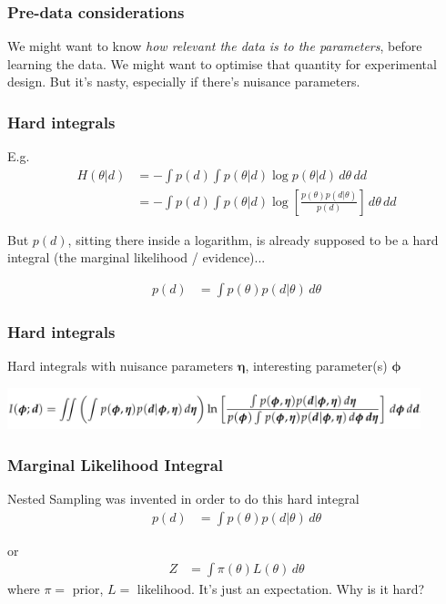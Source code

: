 \documentclass{beamer}
\begin{document}
\begin{frame}
\frametitle{Pre-data considerations}

We might want to know {\em how relevant the data is to the parameters},
before learning the data. We might want to optimise that quantity for
experimental design. But it's nasty, especially if there's nuisance
parameters.
\end{frame}


\begin{frame}
\frametitle{Hard integrals}

E.g.
\begin{align}
H(\theta|d) &= -\int p(d) \int p(\theta|d) \log p(\theta|d) \, d\theta \, dd \\
            &= -\int p(d) \int p(\theta|d)
                    \log\left[\frac{p(\theta)p(d|\theta)}{p(d)}\right] \, d\theta \, dd
\end{align}

But $p(d)$, sitting there inside a logarithm, is already supposed to be
a hard integral (the marginal likelihood / evidence)...

\begin{align}
p(d) &= \int p(\theta) p(d|\theta) \, d\theta
\end{align}

\end{frame}


\begin{frame}
\frametitle{Hard integrals}
Hard integrals with nuisance parameters
$\boldsymbol{\eta}$, interesting parameter(s)
$\boldsymbol{\phi}$
\vspace{0.5em}

\begin{center}
\includegraphics[width=0.9\textwidth]{hard-integrals.png}
\end{center}

\end{frame}


\begin{frame}
\frametitle{Marginal Likelihood Integral}
Nested Sampling was invented in order to do this hard integral
\begin{align}
p(d) &= \int p(\theta) p(d|\theta) \, d\theta
\end{align}

or
\begin{align}
Z &= \int \pi(\theta) L(\theta) \, d\theta
\end{align}
where $\pi=$ prior, $L=$ likelihood.
It's just an expectation. Why is it hard?
\end{frame}
\end{document}
